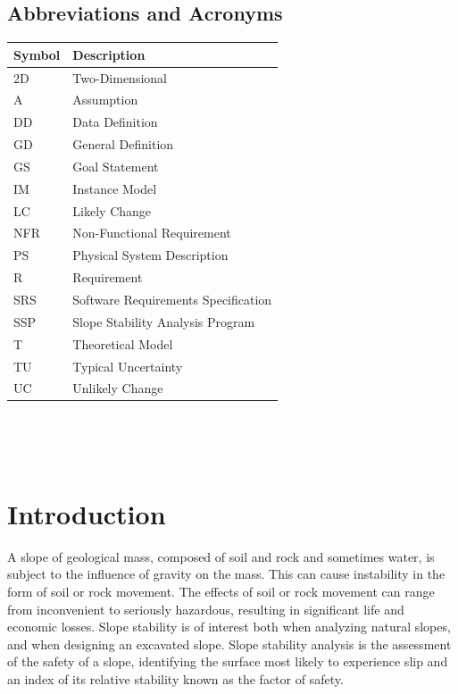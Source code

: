 \documentclass[12pt]{article}
\newcommand{\progname}{SSP}
\renewcommand{\arraystretch}{1}
\begin{document}
\subsection{Abbreviations and Acronyms}

\renewcommand{\arraystretch}{1.2}
\begin{tabular}{l l} 
  \toprule		
  \textbf{Symbol} & \textbf{Description}\\
  \midrule 
  2D & Two-Dimensional\\
  A & Assumption\\
  DD & Data Definition\\
  GD & General Definition\\
  GS & Goal Statement\\
  IM & Instance Model\\
  LC & Likely Change\\
  NFR & Non-Functional Requirement\\
  PS & Physical System Description\\
  R & Requirement\\
  SRS & Software Requirements Specification\\
  \progname\ & Slope Stability Analysis Program\\
  T & Theoretical Model\\
  TU & Typical Uncertainty\\
  UC & Unlikely Change\\
  \bottomrule
\end{tabular}\\

\newpage

\tableofcontents

~\newpage


\setlength{\tabcolsep}{6pt}

\section{Introduction}

A slope of geological mass, composed of soil and rock and sometimes water, is 
subject to the influence of gravity on the mass. This can cause instability in 
the form of soil or rock movement. The effects of soil or rock movement can 
range from inconvenient to seriously hazardous, resulting in significant life 
and economic losses. Slope stability is of interest both when analyzing natural 
slopes, and when designing an excavated slope. Slope stability analysis is the 
assessment of the safety of a slope, identifying the surface most likely to 
experience slip and an index of its relative stability known as the factor of 
safety.
\end{document}
